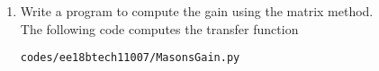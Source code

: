 \begin{enumerate}[label=\thesubsection.\arabic*.,ref=\thesubsection.\theenumi]
\begin{align}
{{\\0&0&-1&1
\\0&0&0&-1/s}}
{
\myvec{1 & 0 & 0 & 1 & 1 \ \\
-1 & 1 & 0 & 0 & 0   \\
 0 & -s-1/s & 1 & 0 & 0 \\
 0 & 0 & -1 & 1 & 0 \\
0 & 0 & 0 & -1/s & 1 }
}
 \label{eq:ee18btech11007_u_gain},
\end{align}
%
using the cofactor expansion and  Problem \ref{prob:ee18btech11007_mat_form}. The gain is obtained as \eqref{eq:ee18btech11003_gain_sol} after expanding the determinants and simplifying.
%
\item Write a program to compute the gain using the matrix method.
\\
\solution The following code computes the transfer function 
\begin{lstlisting}
codes/ee18btech11007/MasonsGain.py
\end{lstlisting}
\end{enumerate}

